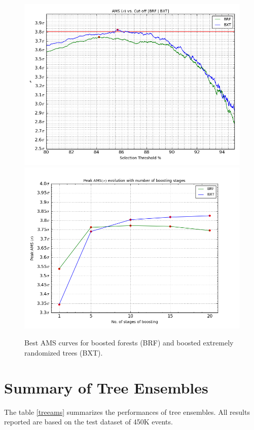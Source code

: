 \begin{figure}
\includegraphics[width=\textwidth]{images/AMS_Curve_BXT_BRF.png}
\includegraphics[width=\textwidth]{images/Peak_AMS_Evolution_BRF_BXT.png}
\caption{Best AMS curves for boosted forests (BRF) and boosted extremely randomized trees (BXT).}
\label{ams_brf_bxt}
\end{figure}

\section{Summary of Tree Ensembles}

The table \ref{treeams} summarizes the performances of tree ensembles. All results reported are based on the test dataset of 450K events. 

